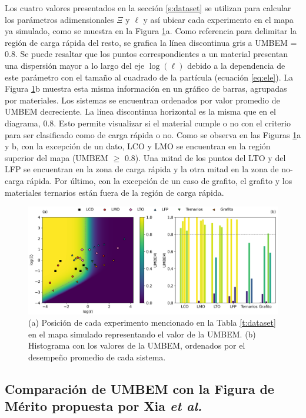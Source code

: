 Los cuatro valores presentados en la sección \ref{s:dataset} se utilizan para calcular los parámetros adimensionales 
$\Xi$ y $\ell$ y así ubicar cada experimento en el mapa ya simulado, como se muestra
en la Figura \ref{fig:UMBEM}a. Como referencia para delimitar la región de carga
rápida del resto, se grafica la línea discontinua gris a UMBEM = 0.8. Se puede
resaltar que los puntos correspondientes a un material presentan una 
dispersión mayor a lo largo del eje $\log(\ell)$ debido a la dependencia de este
parámetro con el tamaño al cuadrado de la partícula (ecuación \ref{eq:ele}). La
Figura \ref{fig:UMBEM}b muestra esta misma información en un gráfico de barras,
agrupadas por materiales. Los sistemas se encuentran ordenados por valor promedio 
de UMBEM decreciente. La línea discontinua horizontal es la misma que
en el diagrama, 0.8. Esto permite visualizar si el material cumple o no con el
criterio para ser clasificado como de carga rápida o no. Como se observa en las
Figuras \ref{fig:UMBEM}a y b, con la excepción de un dato, LCO y LMO se encuentran
en la región superior del mapa (UMBEM $\geq$ 0.8). Una mitad de los puntos del 
LTO y del LFP se encuentran en la zona de carga rápida y la otra mitad en la zona
de no-carga rápida. Por último, con la excepción de un caso de grafito, el grafito
y los materiales ternarios están fuera de la región de carga rápida.
\begin{figure}[h!]
    \centering
    \includegraphics[width=\textwidth]{FastCharging/umbem/UMBEM.png}
    \caption{(a) Posición de cada experimento mencionado en la Tabla 
    \ref{t:dataset} en el mapa simulado representando el valor de la UMBEM. (b)
    Histograma con los valores de la UMBEM, ordenados por el desempeño promedio
    de cada sistema.}
    \label{fig:UMBEM}
\end{figure}

\subsection{Comparación de UMBEM con la Figura de Mérito propuesta por Xia \textit{et al.}}

